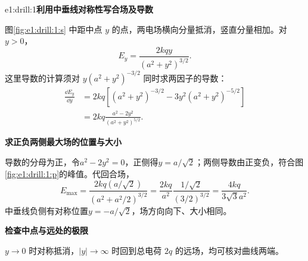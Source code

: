 \LectureAnswerSection

\begin{drillsolution}{e1:drill:1}\textbf{利用中垂线对称性写合场及导数}\par\nobreak
图\ref{fig:e1:drill:1:s} 中距中点 $y$ 的点，两电场横向分量抵消，竖直分量相加。对 $y>0$，
\[
 E_y=\frac{2kqy}{(a^2+y^2)^{3/2}}.
\]
这里导数的计算须对 $y(a^2+y^2)^{-3/2}$ 同时求两因子的导数：
\[
 \begin{aligned}
 \frac{\dd E_y}{\dd y}
 &=2kq\left[(a^2+y^2)^{-3/2}-3y^2(a^2+y^2)^{-5/2}\right]\\
 &=2kq\frac{a^2-2y^2}{(a^2+y^2)^{5/2}}.
\end{aligned}
\]



\par\medskip{}\noindent\textbf{求正负两侧最大场的位置与大小}\par\nobreak
导数的分母为正，令$a^2-2y^2=0$，正侧得$y=a/\sqrt2$；两侧导数由正变负，符合图\ref{fig:e1:drill:1:p}的峰值。代回合场，
\[
E_{\max}=\frac{2kq(a/\sqrt2)}{(a^2+a^2/2)^{3/2}}
=\frac{2kq}{a^2}\frac{1/\sqrt2}{(3/2)^{3/2}}
=\frac{4kq}{3\sqrt3a^2}.
\]
中垂线负侧有对称位置$y=-a/\sqrt2$，场方向向下、大小相同。

\par\medskip{}\noindent\textbf{检查中点与远处的极限}\par\nobreak
$y\to0$ 时对称抵消，$|y|\to\infty$ 时回到总电荷 $2q$ 的远场，均可核对曲线两端。\end{drillsolution}
